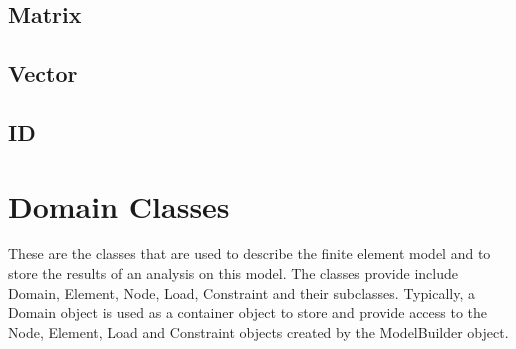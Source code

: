 \pagebreak
\subsection{Matrix}

\pagebreak
\subsection{Vector}


\pagebreak
\subsection{ID}



\pagebreak
\section{Domain Classes}
These are the classes that are used to describe the finite element
model and to store the results of an analysis on this model. The
classes provide include Domain, Element, Node, Load, Constraint and
their subclasses. Typically, a Domain object is used as a container
object to store and provide access to the  Node, Element, Load and
Constraint objects created by the ModelBuilder object.

\pagebreak



\pagebreak

